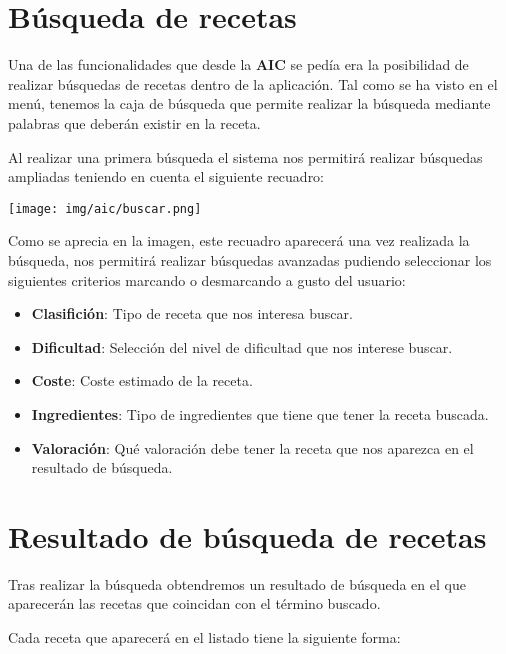 \documentclass{\ClassPath/viu-tfm-template}
\begin{document}
\section{Búsqueda de recetas}

Una de las funcionalidades que desde la \textbf{AIC} se pedía era la posibilidad de realizar búsquedas de recetas dentro de la aplicación. Tal como se ha visto en el menú, tenemos la caja de búsqueda que permite realizar la búsqueda mediante palabras que deberán existir en la receta.

Al realizar una primera búsqueda el sistema nos permitirá realizar búsquedas ampliadas teniendo en cuenta el siguiente recuadro:

    \begin{center}
        \vspace{-10pt}
        \texttt{[image: img/aic/buscar.png]}
        \vspace{-20pt}
    \end{center}

Como se aprecia en la imagen, este recuadro aparecerá una vez realizada la búsqueda, nos permitirá realizar búsquedas avanzadas pudiendo seleccionar los siguientes criterios marcando o desmarcando a gusto del usuario:

\begin{itemize}
    \item \textbf{Clasifición}: Tipo de receta que nos interesa buscar.
    \item \textbf{Dificultad}: Selección del nivel de dificultad que nos interese buscar.
    \item \textbf{Coste}: Coste estimado de la receta.
    \item \textbf{Ingredientes}: Tipo de ingredientes que tiene que tener la receta buscada.
    \item \textbf{Valoración}: Qué valoración debe tener la receta que nos aparezca en el resultado de búsqueda.
\end{itemize}


\section{Resultado de búsqueda de recetas}

Tras realizar la búsqueda obtendremos un resultado de búsqueda en el que aparecerán las recetas que coincidan con el término buscado.

Cada receta que aparecerá en el listado tiene la siguiente forma:
\end{document}
